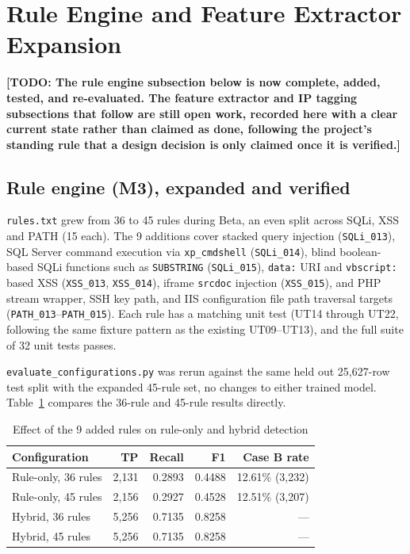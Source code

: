 \documentclass{llncs}
\newcommand{\TODO}[1]{\textbf{[TODO: #1]}}
\begin{document}
\clearpage
\section{Rule Engine and Feature Extractor Expansion}
\label{sec:expansion}

\TODO{The rule engine subsection below is now complete, added, tested,
and re-evaluated. The feature extractor and IP tagging subsections that
follow are still open work, recorded here with a clear current state
rather than claimed as done, following the project's standing rule that
a design decision is only claimed once it is verified.}

\subsection{Rule engine (M3), expanded and verified}
\texttt{rules.txt} grew from 36 to 45 rules during Beta, an even split
across SQLi, XSS and PATH (15 each). The 9 additions cover stacked
query injection (\texttt{SQLi\_013}), SQL Server command execution via
\texttt{xp\_cmdshell} (\texttt{SQLi\_014}), blind boolean-based SQLi
functions such as \texttt{SUBSTRING} (\texttt{SQLi\_015}),
\texttt{data:} URI and \texttt{vbscript:} based XSS
(\texttt{XSS\_013}, \texttt{XSS\_014}), iframe \texttt{srcdoc}
injection (\texttt{XSS\_015}), and PHP stream wrapper, SSH key path,
and IIS configuration file path traversal targets
(\texttt{PATH\_013}--\texttt{PATH\_015}). Each rule has a matching unit
test (UT14 through UT22, following the same fixture pattern as the
existing UT09--UT13), and the full suite of 32 unit tests passes.

\texttt{evaluate\_configurations.py} was rerun against the same held
out 25{,}627-row test split with the expanded 45-rule set, no changes
to either trained model. Table~\ref{tab:ruleexpansion} compares the
36-rule and 45-rule results directly.

\begin{table}[h]
\centering
\caption{Effect of the 9 added rules on rule-only and hybrid detection}
\label{tab:ruleexpansion}
\begin{tabular}{lrrrr}
\toprule
\textbf{Configuration} & \textbf{TP} & \textbf{Recall} & \textbf{F1} & \textbf{Case B rate} \\
\midrule
Rule-only, 36 rules & 2{,}131 & 0.2893 & 0.4488 & 12.61\% (3{,}232) \\
Rule-only, 45 rules & 2{,}156 & 0.2927 & 0.4528 & 12.51\% (3{,}207) \\
Hybrid, 36 rules & 5{,}256 & 0.7135 & 0.8258 & --- \\
Hybrid, 45 rules & 5{,}256 & 0.7135 & 0.8258 & --- \\
\bottomrule
\end{tabular}
\end{table}
\end{document}
